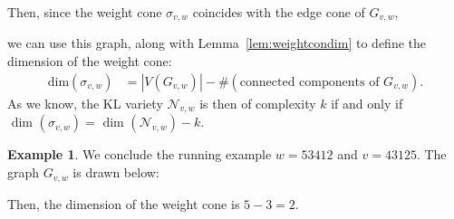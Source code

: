 \documentclass[11pt]{amsart}
\theoremstyle{definition}
\newtheorem{example}[theorem]{Example}
\theoremstyle{definition}
\theoremstyle{definition}
\theoremstyle{definition}
\newcommand{\Gvwt}{G_{v,w}}
\newcommand{\Nvw}{\mathcal{N}_{v,w}}
\begin{document}
\noindent Then, since the weight cone $\sigma_{v,w}$ coincides with the edge cone of $\Gvwt$,

we can use this graph, along with Lemma~\ref{lem:weightcondim} to define the dimension of the weight cone: 
\begin{align*}
\text{dim}(\sigma_{v,w}) & 
= |V(\Gvwt)|-\#(\text{connected components of } \Gvwt). 
 \end{align*}
As we know, the KL variety $\Nvw$ is then of complexity $k$ if and only if
$\text{ dim }(\sigma_{v,w}) = \text{ dim }(\Nvw) - k.$
\begin{example}
    We conclude the running example $w=53412$ and $v=43125$. The graph $\Gvwt$ is drawn below:

\begin{center}
\end{center}
\noindent 
Then, the dimension of the weight cone is $5-3=2$.
\end{example}
\end{document}
